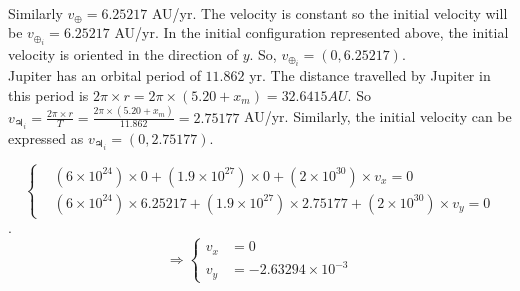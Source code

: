 \documentclass[a4paper, twoside, 11pt]{report}
\theoremstyle{theorem}
\theoremstyle{remark}
\theoremstyle{exemple}
\begin{document}
            \paragraph{}Similarly $v_{\oplus} = 6.25217$ AU/yr. The velocity is constant so the initial velocity will be $v_{\oplus_i}=6.25217$ AU/yr. In the initial configuration represented above, the initial velocity is oriented in the direction of $y$. So, $v_{\oplus_i} = \left(0, 6.25217\right)$. \\
            Jupiter has an orbital period of $11.862$ yr. The distance travelled by Jupiter in this period is $2 \pi \times r = 2 \pi \times (5.20 + x_m) = 32.6415 AU$. So $v_{\jupiter_i}= \frac{2 \pi \times r}{T} = \frac{2 \pi \times (5.20+x_m)}{11.862} = 2.75177 $ AU/yr. Similarly, the initial velocity can be expressed as $v_{\jupiter_i} = \left(0, 2.75177\right)$.
            
                \begin{equation*}
                    \left\{
                        \begin{aligned}
                            &(6\times 10^{24}) \times 0 + (1.9 \times 10^{27}) \times 0 + (2 \times 10^{30}) \times v_x = 0 \\
                            &(6\times 10^{24}) \times 6.25217 + (1.9 \times 10^{27}) \times 2.75177 + (2 \times 10^{30}) \times v_y = 0
                        \end{aligned}
                    \right.
                \end{equation*}.
                \begin{equation*}
                   \Longrightarrow \left\{
                        \begin{aligned}
                            v_x &= 0\\
                            v_y &= - 2.63294 \times 10^{-3}
                        \end{aligned}
                    \right.
                    \tag{6}
                \end{equation*}
\end{document}
